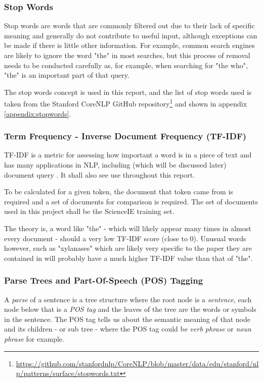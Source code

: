 \subsubsection*{Stop Words}
Stop words are words that are commonly filtered out due to their lack of specific meaning and generally do not contribute to useful input, although exceptions can be made if there is little other information. For example, common search engines are likely to ignore the word "the" in most searches, but this process of removal needs to be conducted carefully as, for example, when searching for "the who", "the" is an important part of that query. 

The stop words concept is used in this report, and the list of stop words used is taken from the Stanford CoreNLP GitHub repository\footnote{\href{https://github.com/stanfordnlp/CoreNLP/blob/master/data/edu/stanford/nlp/patterns/surface/stopwords.txt}{https://github.com/stanfordnlp/CoreNLP/blob/master/data/edu/stanford/nlp/patterns/surface/stopwords.txt}} and shown in appendix \ref{appendix:stopwords}.

\subsubsection*{Term Frequency - Inverse Document Frequency (TF-IDF)}
TF-IDF is a metric for assessing how important a word is in a piece of text and has many applications in NLP, including (which will be discussed later) document query \cite{Ramos2003}. It shall also see use throughout this report.

To be calculated for a given token, the document that token came from is required and a set of documents for comparison is required. The set of documents used in this project shall be the ScienceIE training set.

The theory is, a word like "the" - which will likely appear many times in almost every document - should a very low TF-IDF score (close to 0). Unusual words however, such as "xylanases" which are likely very specific to the paper they are contained in will probably have a much higher TF-IDF value than that of "the".

\subsubsection*{Parse Trees and Part-Of-Speech (POS) Tagging}
A \textit{parse} of a sentence is a tree structure where the root node is a \textit{sentence}, each node below that is a \textit{POS tag} and the leaves of the tree are the words or symbols in the sentence. The POS tag tells us about the semantic meaning of that node and its children - or sub tree - where the POS tag could be \textit{verb phrase} or \textit{noun phrase} for example.


